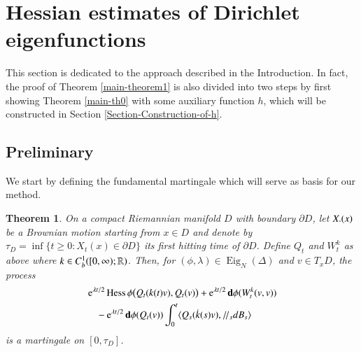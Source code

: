 \documentclass[11pt,reqno]{amsart}
\newtheorem{theorem}{Theorem}[section]
\theoremstyle{definition} \newtheorem{remark}[theorem]{Remark}
\numberwithin{equation}{section}
\newcommand\1{\mathbbm{1}}
\def\Eig{\operatorname{Eig}} \def\II{{\operatorname{II}}}
\def\bd{{\bf d}}
\newcommand{\ptr}{/\!/}
\def\II{{\operatorname{II}}}
\begin{document}
\section{Hessian estimates of Dirichlet eigenfunctions }\label{Dirichlet-section}
This section is  dedicated to  the approach 
described in the Introduction. In fact, the proof of Theorem \ref{main-theorem1}
is  also divided into two steps by first showing  Theorem \ref{main-th0} with some
auxiliary function $h$, which will be constructed in Section \ref{Section-Construction-of-h}.

\subsection{Preliminary}
We start by defining the fundamental martingale which will serve as basis for our method.  


\begin{theorem}\label{th1}
  On a compact Riemannian manifold $D$ with
  boundary $\partial D$, let $X{\bf.}(x)$ be a Brownian motion starting
  from $x\in D$ and denote by $\tau_D=\inf\{t\geq0\colon X_t(x)\in\partial D\}$ its first
  hitting time of $\partial D$. Define $Q_t$ and $W_t^k$ as above where
  $k\in C_b^1([0,\infty);\mathbb{R})$.  Then,
  for $(\phi,\lambda) \in \Eig_N(\Delta)$ and $v\in T_xD$, the process
  \begin{align}\label{martingale-1}
    &\e^{\lambda t/2} \Hess \phi \big(Q_t(k(t)v), Q_t(v)\big)+\e^{\lambda t/2} \bd \phi
      (W_t^k(v, v))\notag\\ 
     &\quad-\e^{\lambda t/2} \bd \phi(Q_t( v))\int_0^t\langle Q_s(\dot{k}(s)v),
     \ptr_sd  B_s \rangle
  \end{align}
  is a martingale on $[0,\tau_D]$.
\end{theorem}
\end{document}
